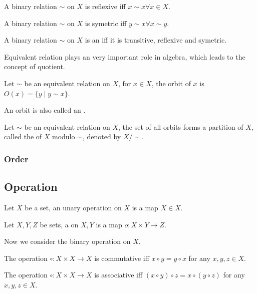 \begin{defi}[reflexive]
A binary relation $\sim$ on $X$ is reflexive iff $x \sim x \forall x \in X$.
\end{defi}

\begin{defi}[symetric]
A binary relation $\sim$ on $X$ is symetric iff $y \sim x \forall x \sim y$.
\end{defi}

\begin{defi}
A binary relation $\sim$ on $X$ is an  iff it is transitive,
reflexive and symetric.
\end{defi}

Equivalent relation plays an very important role in algebra, which leads to the
concept of quotient.

\begin{defi}[orbit]
Let $\sim$ be an equivalent relation on $X$, for $x \in X$, the orbit of $x$ is
$O(x) = \{y \mid y \sim x\}$.
\end{defi}
An orbit is also called an .

\begin{defi}[quotient]
Let $\sim$ be an equivalent relation on $X$, the set of all orbits forms a partition
of $X$, called the  of $X$ modulo $\sim$, denoted by $X / \sim$.
\end{defi}

\subsubsection{Order}

\subsection{Operation}
\begin{defi}
Let $X$ be a set, an unary operation on $X$ is a map $X \in X$.
\end{defi}

\begin{defi}
Let $X, Y, Z$ be sets, a  on $X, Y$ is a map $o : X \times Y \to Z$.
\end{defi}

Now we consider the binary operation on $X$.

\begin{defi}
The operation $\circ : X \times X \to X$ is commutative iff $x \circ y = y \circ x$
for any $x, y, z \in X$.
\end{defi}

\begin{defi}
The operation $\circ : X \times X \to X$ is associative iff $(x \circ y) \circ z = x \circ (y \circ z)$
for any $x, y, z \in X$.
\end{defi}

